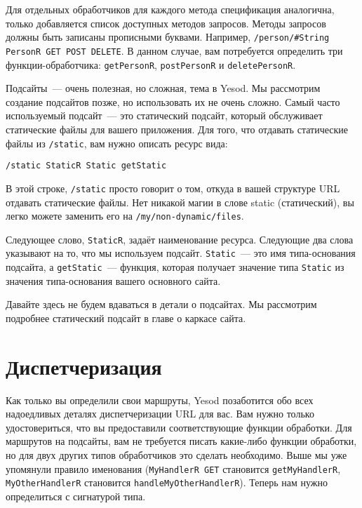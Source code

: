 Для отдельных обработчиков для каждого метода спецификация аналогична,
только добавляется список доступных методов запросов. Методы запросов
должны быть записаны прописными буквами. Например,
\lstinline!/person/#String PersonR GET POST DELETE!.
В данном случае, вам потребуется определить три функции-обработчика:
\lstinline!getPersonR!, \lstinline!postPersonR! и \lstinline!deletePersonR!.

Подсайты~--- очень полезная, но сложная, тема в Yesod. Мы рассмотрим
создание подсайтов позже, но использовать их не очень сложно. Самый
часто используемый подсайт~--- это статический подсайт, который
обслуживает статические файлы для вашего приложения. Для того, что
отдавать статические файлы из \lstinline!/static!, вам нужно описать
ресурс вида:
\begin{verbatim}
/static StaticR Static getStatic
\end{verbatim}

В этой строке, \lstinline!/static! просто говорит о том, откуда в вашей
структуре URL отдавать статические файлы. Нет никакой магии в слове
static (статический), вы легко можете заменить его на
\lstinline!/my/non-dynamic/files!.

Следующее слово, \lstinline!StaticR!, задаёт наименование
ресурса. Следующие два слова указывают на то, что мы используем
подсайт. \lstinline!Static!~--- это имя типа-основания подсайта, а
\lstinline!getStatic!~--- функция, которая получает значение типа
\lstinline!Static! из значения типа-основания вашего основного сайта.

Давайте здесь не будем вдаваться в детали о подсайтах. Мы рассмотрим
подробнее статический подсайт в главе о каркасе
сайта.

\section{Диспетчеризация}
Как только вы определили свои маршруты, Yesod позаботится обо всех
надоедливых деталях диспетчеризации URL для вас. Вам нужно только
удостовериться, что вы предоставили соответствующие функции
обработки. Для маршрутов на подсайты, вам не требуется писать
какие-либо функции обработки, но для двух других типов обработчиков
это сделать необходимо. Выше мы уже упомянули правило именования
(\lstinline!MyHandlerR GET! становится \lstinline!getMyHandlerR!,
\lstinline!MyOtherHandlerR! становится \lstinline!handleMyOtherHandlerR!).
Теперь нам нужно определиться с сигнатурой типа.

